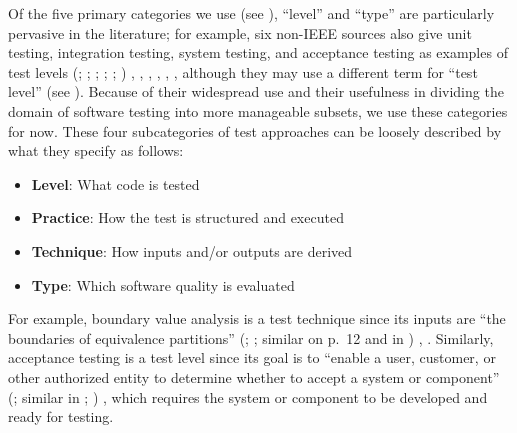 Of the five primary categories we use (see ), ``level''
and ``type'' are particularly pervasive in the literature; for example,
six non-IEEE sources also give unit testing, integration testing,
system testing, and acceptance testing as examples of test levels \ifnotpaper
    (\citealp[pp.~5\=/6 to 5\=/7]{SWEBOK2024}; \citealpISTQB{};
    \citealp[pp.~807\==808]{Perry2006}; \citealp[pp.~443\==445]{PetersAndPedrycz2000};
    \citealp[p.~218]{KuļešovsEtAl2013};
    \citealp[pp.~9, 13]{Gerrard2000a})\else
    \cite[pp.~443\==445]{PetersAndPedrycz2000},
    \cite[pp.~5\=/6 to 5\=/7]{SWEBOK2024}, \cite{ISTQB},
    \cite[pp.~807\==808]{Perry2006}, \cite[pp.~9, 13]{Gerrard2000a},
    \cite[p.~218]{KuļešovsEtAl2013}\fi,
although they may use a different term for ``test
level'' (see ). Because of their widespread use and
their usefulness in dividing the domain of software testing into more
manageable subsets, we use these categories for now. These four subcategories
of test approaches can be loosely described by what they specify as
follows:
\begin{itemize}
    \item \textbf{Level}: What code is tested
    \item \textbf{Practice}: How the test is structured and executed
    \item \textbf{Technique}: How inputs and/or outputs are derived
    \item \textbf{Type}: Which software quality is evaluated
\end{itemize}
For example, boundary value analysis is a test technique since its inputs are
``the boundaries of equivalence partitions'' \ifnotpaper
    (\citealp[p.~2]{IEEE2022}; \citeyear[p.~1]{IEEE2021}; similar on p.~12 and
    in \citealpISTQB{})%
\else
    \cite[p.~2]{IEEE2022}, \cite[p.~1]{IEEE2021}%
\fi. Similarly, acceptance testing is a test level since its goal is to
``enable a user, customer, or other authorized entity to determine whether to
accept a system or component'' \ifnotpaper (\citealp[p.~5]{IEEE2017}; similar
    in \citeyear[p.~6]{IEEE2021}; \citealp[p.~344]{SakamotoEtAl2013})\else
    \cite[p.~5]{IEEE2017}\fi, which requires the system or component to be
developed and ready for testing.

\ifnotpaper
    \afterpage{
        \begin{landscape}
            \ieeeCatsTable{}
            \newpage
            \otherCatsTable{}
        \end{landscape}
    }
\fi

